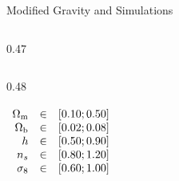 \begin{block}{Modified Gravity and Simulations}
\begin{columns}[t]
\begin{column}{0.47\linewidth}
\begin{columns}[T]
        \begin{column}{0.48\linewidth}
          \vspace{0pt}
          \begin{table}
            \centering
            \renewcommand{\arraystretch}{1.2}
            $\begin{array}[t]{r c l}
              \Omega_{\mathrm{m}} & \in & [0.10; 0.50] \\
              \Omega_{\mathrm{b}} & \in & [0.02; 0.08] \\
              h & \in & [0.50; 0.90] \\
              n_s & \in & [0.80; 1.20] \\
              \sigma_8 & \in & [0.60; 1.00]\\
              &&
            \end{array}$
            \caption{Parameters for the \lcdm simulations.}
          \end{table}
        \end{column}
      \end{columns}
      
      
    \end{column}
  \end{columns}
\vspace{-1.2ex}
\end{block}
    